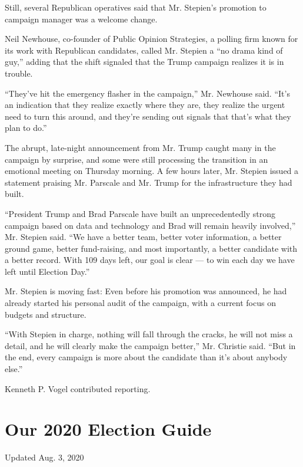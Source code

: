 Still, several Republican operatives said that Mr. Stepien's promotion
to campaign manager was a welcome change.

Neil Newhouse, co-founder of Public Opinion Strategies, a polling firm
known for its work with Republican candidates, called Mr. Stepien a ``no
drama kind of guy,'' adding that the shift signaled that the Trump
campaign realizes it is in trouble.

``They've hit the emergency flasher in the campaign,'' Mr. Newhouse
said. ``It's an indication that they realize exactly where they are,
they realize the urgent need to turn this around, and they're sending
out signals that that's what they plan to do.''

The abrupt, late-night announcement from Mr. Trump caught many in the
campaign by surprise, and some were still processing the transition in
an emotional meeting on Thursday morning. A few hours later, Mr. Stepien
issued a statement praising Mr. Parscale and Mr. Trump for the
infrastructure they had built.

``President Trump and Brad Parscale have built an unprecedentedly strong
campaign based on data and technology and Brad will remain heavily
involved,'' Mr. Stepien said. ``We have a better team, better voter
information, a better ground game, better fund-raising, and most
importantly, a better candidate with a better record. With 109 days
left, our goal is clear --- to win each day we have left until Election
Day.''

Mr. Stepien is moving fast: Even before his promotion was announced, he
had already started his personal audit of the campaign, with a current
focus on budgets and structure.

``With Stepien in charge, nothing will fall through the cracks, he will
not miss a detail, and he will clearly make the campaign better,'' Mr.
Christie said. ``But in the end, every campaign is more about the
candidate than it's about anybody else.''

Kenneth P. Vogel contributed reporting.

\hypertarget{our-2020-election-guide}{%
\section{Our 2020 Election Guide}\label{our-2020-election-guide}}

Updated Aug. 3, 2020

